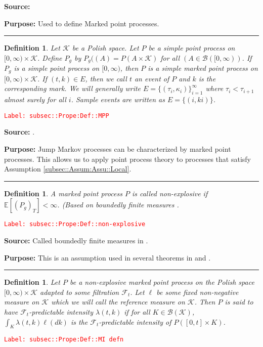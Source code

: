 \documentclass[12pt]{article}
\newcommand{\mb}{\mathbb}
\newcommand{\mc}{\mathcal}
\newcommand{\ms}{\mathscr}
\newcommand{\tr}{\textcolor{red}}
\newcommand{\labe}[1]{\tr{\texttt{Label: #1}}}
\newcommand{\purpose}{\textbf{Purpose: }}
\newcommand{\lin}{\rule{\linewidth}{0.4 pt}}
\newcommand{\ex}[1]{\mb{E}\left[#1\right]}			%
\renewcommand{\t}{t}							%
\newcommand{\F}{\mc{F}}							%
\newcommand{\ts}[1]{_{#1}}						%
\newcommand{\rate}{\lambda}						%
\newcommand{\indx}[1]{_{#1}}					%
\newcommand{\rt}{\tau}							%
\renewcommand{\mark}{\kappa}					%
\newcommand{\rp}{P}								%
\newcommand{\typset}{A}							%
\newcommand{\evs}{E}							%
\newcommand{\mspce}{\mc{K}}						%
\newcommand{\rpg}{\rp_g}						%
\newtheorem{defn}[thms]{Definition}
\begin{document}
\textbf{Source: }\cite[Definition 9.1.II]{DalVer08}

\purpose Used to define Marked point processes.

\lin

\begin{defn}
Let \(\mspce\) be a Polish space. Let \(\rp\) be a simple point process on \([0,\infty)\times \mspce\). Define \(\rpg\) by \(\rpg((\typset) = \rp(\typset\times \mspce)\) for all \((\typset \in \ms{B}([0,\infty))\). If \(\rpg\) is a simple point process on \([0,\infty)\), then \(\rp\) is a simple marked point process on \([0,\infty)\times \mspce\). If \((\t,k) \in \evs\), then we call \(\t\) an event of \(\rp\) and \(k\) is the corresponding mark. We will generally write \(\evs = \{(\rt\indx{i},\mark\indx{i})\}_{i=1}^{\infty}\) where \(\rt\indx{i} < \rt\indx{i+1}\) almost surely for all \(i\). Sample events are written as \(\evs = \{(	{i},k{i})\}\). 
\label{subsec::Prope:Def::MPP}
\end{defn}
\labe{subsec::Prope:Def::MPP}

\textbf{Source: }\cite[Definition 6.4.I]{DalVer03}.

\purpose Jump Markov processes can be characterized by marked point processes. This allows us to apply point process theory to processes that satisfy Assumption \ref{subsec::Assum:Assu::Local}.

\lin

\begin{defn}
A marked point process \(\rp\) is called non-explosive if \(\ex{(\rpg)_T} < \infty\). (Based on boundedly finite measures \cite[Definition 9.1.I]{DalVer08}.
\label{subsec::Prope:Def::non-explosive}
\end{defn}
\labe{subsec::Prope:Def::non-explosive}

\textbf{Source: } Called boundedly finite measures in \cite[Definition 9.1.I]{DalVer08}.

\purpose This is an assumption used in several theorems in \cite{DalVer03} and \cite{DalVer08}.

\lin

\begin{defn}
Let \(\rp\) be a non-explosive marked point process on the Polish space \([0,\infty)\times \mspce\) adapted to some filtration \(\F\ts{\t}\). Let \(\ell\) be some fixed non-negative measure on \(\mspce\) which we will call the reference measure on \(\mspce\). Then \(\rp\) is said to have \(\F\ts{\t}\)-predictable intensity \(\rate(\t,k)\) if for all \(K \in \ms{B}(\mspce)\), \(\int_K \rate(\t,k)\ell(dk)\) is the \(\F\ts{\t}\)-predictable intensity of \(\rp([0,\t]\times K)\). 
\label{subsec::Prope:Def::MI defn}
\end{defn}
\labe{subsec::Prope:Def::MI defn}
\end{document}
